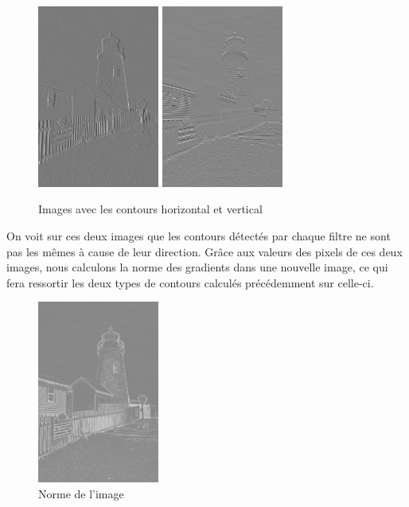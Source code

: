 \documentclass[a4paper,11pt]{article}
\begin{document}
  \begin{figure}[H]
  \center
   \includegraphics[width=4cm]{../lighthouse_8bits_grad_x.png}
   \includegraphics[width=4cm]{../lighthouse_8bits_grad_y.png}
   \caption{Images avec les contours horizontal et vertical}
  \end{figure}

  On voit sur ces deux images que les contours détectés par chaque filtre ne sont pas les mêmes
  à cause de leur direction. Grâce aux valeurs des pixels de ces deux images, nous calculons la norme
  des gradients dans une nouvelle image, ce qui fera ressortir les deux types de contours calculés précédemment
  sur celle-ci.

  \begin{figure}[H]
  \center
   \includegraphics[width=4cm]{../norme32.png}
   \caption{Norme de l'image}
  \end{figure}
  
\end{document}
